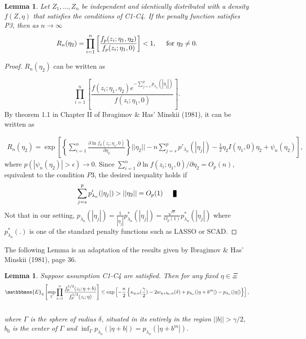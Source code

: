 \documentclass[11pt]{statsoc}
\newtheorem{lemma}[theorem]{Lemma}
\begin{document}
\begin{lemma}
Let $Z_1,...,Z_n$ be independent and identically distributed with a density
$f(Z,\eta)$ that satisfies the conditions of C1-C4. If the
penalty function satisfies P3, then as $n \rightarrow \infty$
\begin{align}
R_n(\eta_2) =\prod_{i=1}^n \left[\frac{f_p(z_i;\eta_1,\eta_2)}{f_p(z_i;\eta_1,0)} \right]< 1, \hspace{.2in} \text{for } \eta_2\neq0.
\label{eq:inc}
\end{align}
\label{lem:inc}
\end{lemma}

\begin{proof}
$R_n(\eta_2)$ can be written as

\[
\prod_{i=1}^n \left[\frac{f(z_i;\eta_1,\eta_2)e^{-\sum_{j=s}^p p_{\lambda_n}(|\eta_j|)}}{f(z_i;\eta_1,0)} \right].
\]
By theorem 1.1 in Chapter II of Ibragimov \& Has' Minskii (1981), it can be written as

\begin{align*}
R_n(\eta_2) = \exp\left [ \left\{\sum_{i=1}^n \frac{\partial \ln f_p(z_i;\eta_1,0)}{\partial \eta_2} \right\}||\eta_2||
-n\sum_{j=s}^p p'_{\lambda_n}(|\eta_j|)-\frac{1}{2} \eta_2I(\eta_1,0)\eta_2+\psi_n(\eta_2) \right],
\end{align*}
where $p(|\psi_n(\eta_2)|>\epsilon) \rightarrow 0$. Since $\sum _{i=1}^n
\partial \ln f(z_i;\eta_1,0)/\partial \eta_2=O_p(n)$, equivalent to the condition
$P3$, the desired inequality holds if
\[
\sum_{j=s}^p p'_{\lambda_n}(|\eta_j|) >||\eta_2|| = O_p(1) {\nobreak \ifvmode \relax \else
      \ifdim\lastskip<1.5em \hskip-\lastskip
      \hskip1.5em plus0em minus0.5em \fi \nobreak
      \vrule height0.75em width0.5em depth0.25em\fi}
\]
Not that in our setting, $p_{\lambda_n}(|\eta_j|)= \frac{1}{|\eta_j|}p^*_{\lambda_n}(|\eta_j|)=\frac{\sqrt n}{O_p(1)}p^*_{\lambda_n}(|\eta_j|) $ where $p^*_{\lambda_n}(.)$ is one of the standard penalty functions such as LASSO or SCAD.
\end{proof}

The following Lemma is an adaptation of the results given by
Ibragimov \& Has' Minskii (1981), page 36.
\begin{lemma}
Suppose assumption C1-C4 are satisfied. Then for any fixed $\eta \in \Xi$ {\small{
\begin{align}
{\mathbbmss{E}}_{\eta} \left[ \sup_{\Gamma} \prod_{i=1}^n \frac{f_p^{1/2}(z_i;\eta+b)}{f_p^{1/2}(z_i;\eta)}   \right]
\leq \exp\left[ -\frac{n}{2}\left\{ \kappa_{\eta,n}(\frac{\gamma}{2}) -  2w_{\eta+b_0,n}(\delta) +
p_{\lambda_n}(|\eta+b^m|)-p_{\lambda_n}(|\eta|)  \right \}\right],
\label{eq:hesmin}
\end{align} }}\\
where $\Gamma$ is the sphere of radius $\delta$, situated in its entirely in
the region $||b||>\gamma/2$, $b_0$ is the center of $\Gamma$ and $\inf_{\Gamma}
p_{\lambda_n}(|\eta+b|)= p_{\lambda_n}(|\eta+b^m|)$. \label{lem:hesmin}
\end{lemma}
\end{document}
